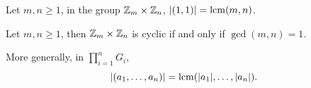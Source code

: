 \begin{proposition}
  Let \(m,n\geq 1\), in the group \(\mathbb{Z}_m\times\mathbb{Z}_n\), \(|(1,1)| = \operatorname{lcm}(m,n)\).
\end{proposition}
\begin{corollary}
  Let \(m,n\geq 1\), then \(\mathbb{Z}_m\times\mathbb{Z}_n\) is cyclic if and only if \(\gcd(m,n) = 1\).
\end{corollary}

\begin{theorem}
  More generally, in \(\prod_{i=1}^n G_i\), \[
    |(a_1,\ldots,a_n)| = \operatorname{lcm}(|a_1|,\ldots,|a_n|).
  \]
\end{theorem}